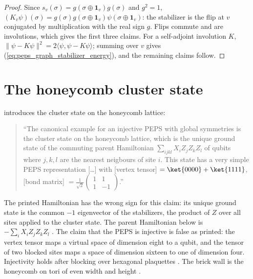 \begin{proof}\leanok
    Since $s_v(\sigma)=g(\sigma\oplus\mathbf{1}_v)g(\sigma)$ and $g^2=1$,
    $(K_v\psi)(\sigma)=g(\sigma)g(\sigma\oplus\mathbf{1}_v)
        \psi(\sigma\oplus\mathbf{1}_v)$: the stabilizer is the flip at $v$
    conjugated by multiplication with the real sign $g$. Flips commute and
    are involutions, which gives the first three claims. For a self-adjoint
    involution $K$, $\|\psi-K\psi\|^2=2\langle\psi,\psi-K\psi\rangle$;
    summing over $v$ gives (\ref{eq:peps_graph_stabilizer_energy}), and the
    remaining claims follow.
\end{proof}

\section{The honeycomb cluster state}%
\label{sec:peps_honeycomb_cluster}

\cite[Section~IV]{Cirac2021Matrix} introduces the cluster state on the
honeycomb lattice:
\begin{quote}
    ``The canonical example for an injective PEPS with global symmetries is
    the cluster state on the honeycomb lattice, which is the unique ground
    state of the commuting parent Hamiltonian $\sum_{ijkl}X_iZ_jZ_kZ_l$ of
    qubits where $j,k,l$ are the nearest neigbours of site $i$. This state
    has a very simple PEPS representation [\ldots] with [vertex tensor]
    $=\ket{0000}+\ket{1111}$, [bond matrix]
    $=\frac{1}{\sqrt{2}}\left(\begin{smallmatrix} 1 & 1\\ 1 &
                -1\end{smallmatrix}\right)$.''
\end{quote}
The printed Hamiltonian has the wrong sign for this claim: its unique ground
state is the common $-1$ eigenvector of the stabilizers, the product of $Z$
over all sites applied to the cluster state. The parent Hamiltonian below is
$-\sum_iX_iZ_jZ_kZ_l$ \cite{gap:rmp_honeycomb_cluster_peps}. The claim that
the PEPS is injective is false as printed: the vertex tensor maps a virtual
space of dimension eight to a qubit, and the tensor of two blocked sites maps
a space of dimension sixteen to one of dimension four. Injectivity holds after
blocking over hexagonal plaquettes \cite{gap:rmp_honeycomb_cluster_injectivity}.
The brick wall is the honeycomb on tori of even width and height
\cite{gap:rmp_peps_examples_small_torus}.

